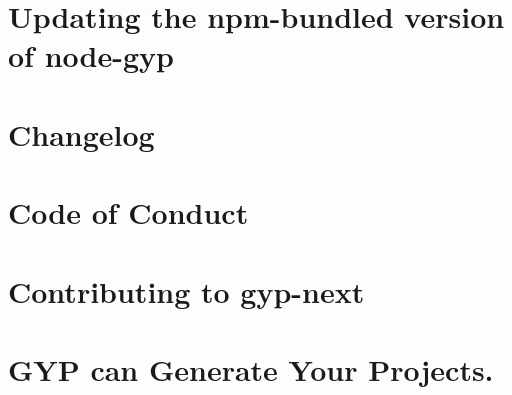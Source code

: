 \documentclass[twoside]{book}
\newcommand{\+}{\discretionary{\mbox{\scriptsize$\hookleftarrow$}}{}{}}
\begin{document}
\chapter{Updating the npm-\/bundled version of node-\/gyp}
\label{md__c___users_vaishnavi_jadhav__desktop__developer_code_mean_stack_example_client_node_modules_n6908bf38cd8999225d758072a10a7672}

\chapter{Changelog}
\label{md__c___users_vaishnavi_jadhav__desktop__developer_code_mean_stack_example_client_node_modules_node_gyp_gyp__c_h_a_n_g_e_l_o_g}

\chapter{Code of Conduct}
\label{md__c___users_vaishnavi_jadhav__desktop__developer_code_mean_stack_example_client_node_modules_n9698bab23b664f2e9fa763e0dc94c06b}

\chapter{Contributing to gyp-\/next}
\label{md__c___users_vaishnavi_jadhav__desktop__developer_code_mean_stack_example_client_node_modules_nc8d8714183f0ac752c9d62eb9215e769}

\chapter{GYP can Generate Your Projects.}
\label{md__c___users_vaishnavi_jadhav__desktop__developer_code_mean_stack_example_client_node_modules_node_gyp_gyp__r_e_a_d_m_e}

\end{document}
